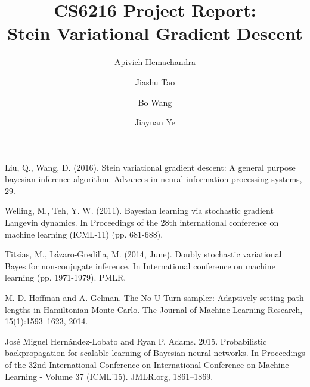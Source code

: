 \documentclass[runningheads]{llncs}
\begin{document}
%
\title{CS6216 Project Report: \\Stein Variational Gradient Descent}
%
\author{Apivich Hemachandra \and
Jiashu Tao \and
Bo Wang   \and
Jiayuan Ye }
%
%


\maketitle              %
%

%





%
%
%
% 
% 
%
\begin{thebibliography}{8}
Liu, Q., Wang, D. (2016). Stein variational gradient descent: A general purpose bayesian inference algorithm. Advances in neural information processing systems, 29.

Welling, M., Teh, Y. W. (2011). Bayesian learning via stochastic gradient Langevin dynamics. In Proceedings of the 28th international conference on machine learning (ICML-11) (pp. 681-688).

Titsias, M., Lázaro-Gredilla, M. (2014, June). Doubly stochastic variational Bayes for non-conjugate inference. In International conference on machine learning (pp. 1971-1979). PMLR.

M. D. Hoffman and A. Gelman. The No-U-Turn sampler: Adaptively setting path lengths in Hamiltonian Monte Carlo. The Journal of Machine Learning Research, 15(1):1593–1623, 2014.

José Miguel Hernández-Lobato and Ryan P. Adams. 2015. Probabilistic backpropagation for scalable learning of Bayesian neural networks. In Proceedings of the 32nd International Conference on International Conference on Machine Learning - Volume 37 (ICML'15). JMLR.org, 1861–1869.
\end{thebibliography}

\appendix



\end{document}
